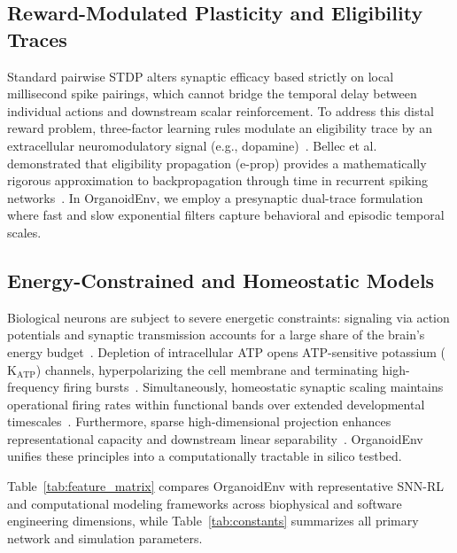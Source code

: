 \documentclass[journal]{IEEEtran}
\begin{document}
\subsection{Reward-Modulated Plasticity and Eligibility Traces}
Standard pairwise STDP alters synaptic efficacy based strictly on local millisecond spike pairings, which cannot bridge the temporal delay between individual actions and downstream scalar reinforcement. To address this distal reward problem, three-factor learning rules modulate an eligibility trace by an extracellular neuromodulatory signal (e.g., dopamine)~\cite{Izhikevich2007Solving,Florian2007Reinforcement,Legenstein2008Learning,Fremaux2016Neuromodulated}. Bellec et al. demonstrated that eligibility propagation (e-prop) provides a mathematically rigorous approximation to backpropagation through time in recurrent spiking networks~\cite{Bellec2020Eprop}. In OrganoidEnv, we employ a presynaptic dual-trace formulation where fast and slow exponential filters capture behavioral and episodic temporal scales.

\subsection{Energy-Constrained and Homeostatic Models}
Biological neurons are subject to severe energetic constraints: signaling via action potentials and synaptic transmission accounts for a large share of the brain's energy budget~\cite{Laughlin1998Metabolic}. Depletion of intracellular ATP opens ATP-sensitive potassium ($\mathrm{K}_{\mathrm{ATP}}$) channels, hyperpolarizing the cell membrane and terminating high-frequency firing bursts~\cite{Tanner2011}. Simultaneously, homeostatic synaptic scaling maintains operational firing rates within functional bands over extended developmental timescales~\cite{Turrigiano2008SelfTuning}. Furthermore, sparse high-dimensional projection enhances representational capacity and downstream linear separability~\cite{Babadi2014Sparse,Kanerva1988SDM}. OrganoidEnv unifies these principles into a computationally tractable in silico testbed.

Table~\ref{tab:feature_matrix} compares OrganoidEnv with representative SNN-RL and computational modeling frameworks across biophysical and software engineering dimensions, while Table~\ref{tab:constants} summarizes all primary network and simulation parameters.
\end{document}
